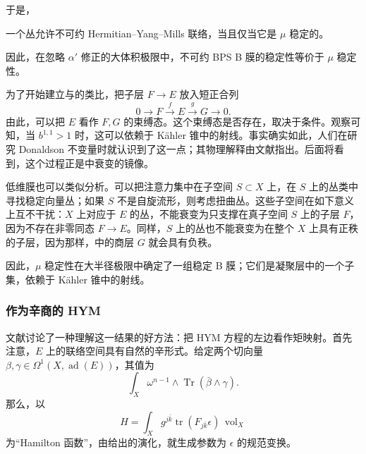 于是，
\begin{theorem}\label{thm:5.8}
一个丛允许不可约 Hermitian--Yang--Mills 联络，当且仅当它是 $\mu$ 稳定的。
\end{theorem}

因此，在忽略 $\alpha'$ 修正的大体积极限中，不可约 BPS B 膜的稳定性等价于 $\mu$ 稳定性。

为了开始建立与的类比，把子层 $F\to E$ 放入短正合列
\begin{equation}\label{eq:5.36}
0\longrightarrow F\xrightarrow{f}E\xrightarrow{g}G\longrightarrow0.
\end{equation}
由此，可以把 $E$ 看作 $F,G$ 的束缚态。这个束缚态是否存在，取决于条件。观察可知，当 $b^{1,1}>1$ 时，这可以依赖于 K\"ahler 锥中的射线。事实确实如此，人们在研究 Donaldson 不变量时就认识到了这一点；其物理解释由文献指出。后面将看到，这个过程正是中衰变的镜像。

低维膜也可以类似分析。可以把注意力集中在子空间 $S\subset X$ 上，在 $S$ 上的丛类中寻找稳定向量丛；如果 $S$ 不是自旋流形，则考虑扭曲丛。这些子空间在如下意义上互不干扰：$X$ 上对应于 $E$ 的丛，不能衰变为只支撑在真子空间 $S$ 上的子层 $F$，因为不存在非零同态 $F\to E$。同样，$S$ 上的丛也不能衰变为在整个 $X$ 上具有正秩的子层，因为那样，中的商层 $G$ 就会具有负秩。

因此，$\mu$ 稳定性在大半径极限中确定了一组稳定 B 膜；它们是凝聚层中的一个子集，依赖于 K\"ahler 锥中的射线。

\subsubsection{作为辛商的 HYM}\label{sec:5.2.2.1}

文献讨论了一种理解这一结果的好方法：把 HYM 方程的左边看作矩映射。首先注意，$E$ 上的联络空间具有自然的辛形式。给定两个切向量 $\beta,\gamma\in\Omega^1(X,\operatorname{ad}(E))$，其值为
\begin{equation}\label{eq:5.37}
\int_X\omega^{n-1}\wedge\operatorname{Tr}(\bar\beta\wedge\gamma).
\end{equation}
那么，以
\[
H=\int_X g^{j\bar k}\operatorname{tr}(F_{j\bar k}\epsilon)\,\operatorname{vol}_X
\]
为“Hamilton 函数”，由给出的演化，就生成参数为 $\epsilon$ 的规范变换。

